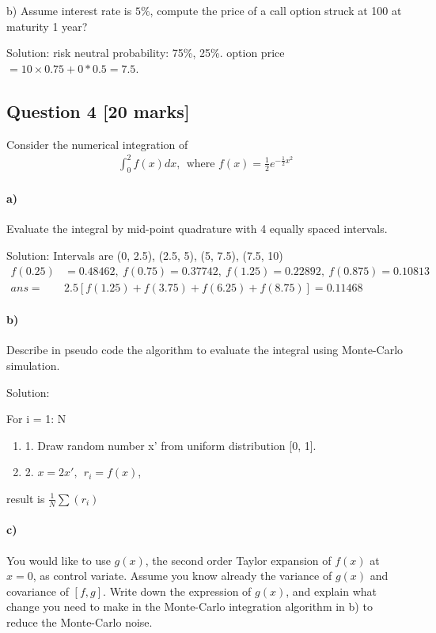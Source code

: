 \documentclass[11pt,a4paper,hidelinks,fleqn]{article}            %
\begin{document}
b) Assume interest rate is $5\%$, compute the price of a call option struck at 100 at maturity 1 year?

Solution: risk neutral probability: 75\%, 25\%. option price $= 10 \times 0.75 + 0 * 0.5 = 7.5$.


\subsection*{Question 4 [20 marks]} 
Consider the numerical integration of 
\begin{align*}
\int_0^{2} f(x) dx, ~~\text{where~} f(x) = \frac{1}{2} e^{-\frac12x^2}
\end{align*}

\paragraph{a)} Evaluate the integral by mid-point quadrature with 4 equally spaced intervals. 

Solution:
Intervals are (0, 2.5), (2.5, 5), (5, 7.5), (7.5, 10)
\begin{align*}
f(0.25) & = 0.48462, 
~f(0.75) = 0.37742, 
~f(1.25) = 0.22892, 
~f(0.875) = 0.10813  \\
ans = & 2.5 [f(1.25) + f(3.75) + f(6.25) + f(8.75)] = 0.11468
\end{align*}


\paragraph{b)} Describe in pseudo code the algorithm to evaluate the integral using Monte-Carlo simulation.

Solution:

For i = 1: N
\begin{enumerate}
\item[]{1.} Draw random number x' from uniform distribution [0, 1].
\item[]{2.} $x=2x', ~~r_i = f(x)$,
\end{enumerate}
result is $\frac1N \sum(r_i)$
 
\paragraph{c)} You would like to use $g(x)$, the second order Taylor 
expansion of $f(x)$ at $x=0$, as control variate. 
Assume you know already the variance of $g(x)$ and covariance of $[f, g]$.
Write down the expression of $g(x)$, 
and explain what change you need to make in the Monte-Carlo integration algorithm in b) to reduce the Monte-Carlo noise.
\end{document}
